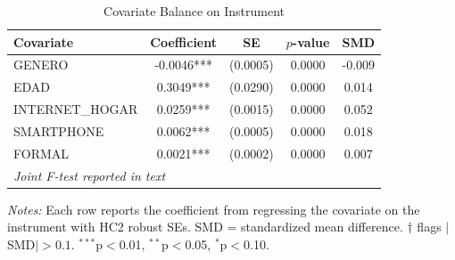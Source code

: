 \begin{table}[htbp]
\centering
\caption{Covariate Balance on Instrument}
\label{tab:balance}
\begin{tabular}{l cccc}
\toprule
Covariate & Coefficient & SE & $p$-value & SMD \\
\midrule
  GENERO & -0.0046*** & (0.0005) & 0.0000 & -0.009 \\
  EDAD & 0.3049*** & (0.0290) & 0.0000 & 0.014 \\
  INTERNET_HOGAR & 0.0259*** & (0.0015) & 0.0000 & 0.052 \\
  SMARTPHONE & 0.0062*** & (0.0005) & 0.0000 & 0.018 \\
  FORMAL & 0.0021*** & (0.0002) & 0.0000 & 0.007 \\
\midrule
\multicolumn{5}{l}{\textit{Joint F-test reported in text}} \\
\bottomrule
\end{tabular}
\begin{tablenotes}
\small
\item \textit{Notes:} Each row reports the coefficient from regressing the covariate on the instrument with HC2 robust SEs. SMD = standardized mean difference. $\dagger$ flags $|$SMD$| > 0.1$. $^{***}$p$<$0.01, $^{**}$p$<$0.05, $^{*}$p$<$0.10.
\end{tablenotes}
\end{table}